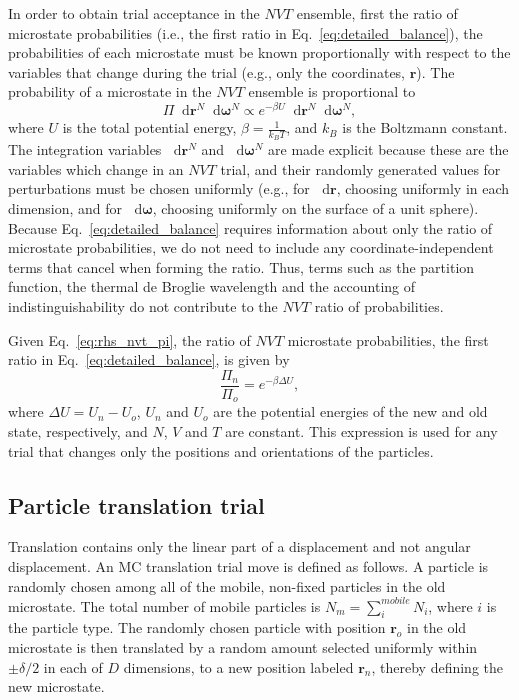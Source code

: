 \documentclass[
  9pt,
  bestpractices,
]{livecoms}
\newcommand*\diff{\mathop{}\!\mathrm{d}}
\begin{document}
In order to obtain trial acceptance in the $NVT$ ensemble, first the ratio of microstate probabilities (i.e., the first ratio in Eq.~\ref{eq:detailed_balance}), the probabilities of each microstate must be known proportionally with respect to the variables that change during the trial (e.g., only the coordinates, $\mathbf{r}$).
The probability of a microstate in the $NVT$ ensemble is proportional to \cite{allen_computer_1989, frenkel_understanding_2002}
\begin{equation}
\Pi \diff\mathbf{r}^N\diff\boldsymbol{\omega}^N \propto e^{-\beta U} \diff\mathbf{r}^N\diff\boldsymbol{\omega}^N,
\label{eq:rhs_nvt_pi}
\end{equation}
where $U$ is the total potential energy, $\beta=\frac{1}{k_B T}$, and $k_B$ is the Boltzmann constant.
The integration variables $\diff\mathbf{r}^{N}$ and $\diff\boldsymbol{\omega}^{N}$ are made explicit because these are the variables which change in an $NVT$ trial, and their randomly generated values for perturbations must be chosen uniformly (e.g., for $\diff\mathbf{r}$, choosing uniformly in each dimension, and for $\diff\boldsymbol{\omega}$, choosing uniformly on the surface of a unit sphere).
Because Eq.~\ref{eq:detailed_balance} requires information about only the ratio of microstate probabilities, we do not need to include any coordinate-independent terms that cancel when forming the ratio.
Thus, terms such as the partition function, the thermal de Broglie wavelength and the accounting of indistinguishability do not contribute to the $NVT$ ratio of probabilities.

Given Eq.~\ref{eq:rhs_nvt_pi}, the ratio of $NVT$ microstate probabilities, the first ratio in Eq.~\ref{eq:detailed_balance}, is given by
\begin{equation}
\frac{\Pi_n}{\Pi_o} = e^{-\beta\Delta U},
\label{eq:rhs_nvt}
\end{equation}
where $\Delta U = U_n - U_o$, $U_n$ and $U_o$ are the potential energies of the new and old state, respectively, and $N$, $V$ and $T$ are constant.
This expression is used for any trial that changes only the positions and orientations of the particles.

\subsection{\label{sec:lhs_translation}Particle translation trial}

Translation contains only the linear part of a displacement and not angular displacement.
An MC translation trial move is defined as follows.
A particle is randomly chosen among all of the mobile, non-fixed particles in the old microstate.
The total number of mobile particles is $N_m=\sum_i^{mobile} N_i$, where $i$ is the particle type.
The randomly chosen particle with position $\mathbf{r}_o$ in the old microstate is then translated by a random amount selected uniformly within $\pm\delta/2$ in each of $D$ dimensions, to a new position labeled $\mathbf{r}_n$, thereby defining the new microstate.
\end{document}
